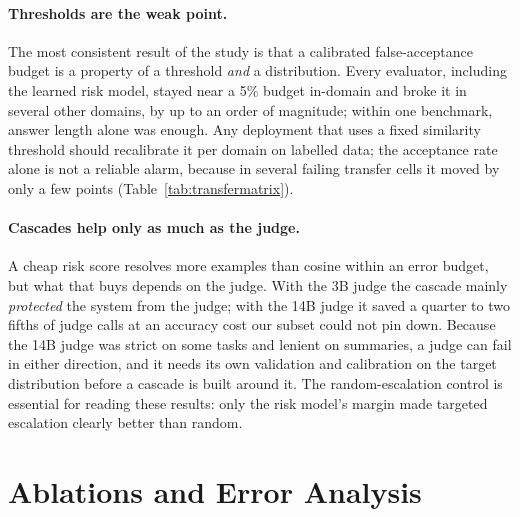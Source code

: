 \paragraph{Thresholds are the weak point.} The most consistent result of the study is that a calibrated false-acceptance budget is a property of a threshold \emph{and} a distribution. Every evaluator, including the learned risk model, stayed near a 5\% budget in-domain and broke it in several other domains, by up to an order of magnitude; within one benchmark, answer length alone was enough. Any deployment that uses a fixed similarity threshold should recalibrate it per domain on labelled data; the acceptance rate alone is not a reliable alarm, because in several failing transfer cells it moved by only a few points (Table~\ref{tab:transfermatrix}).

\paragraph{Cascades help only as much as the judge.} A cheap risk score resolves more examples than cosine within an error budget, but what that buys depends on the judge. With the 3B judge the cascade mainly \emph{protected} the system from the judge; with the 14B judge it saved a quarter to two fifths of judge calls at an accuracy cost our subset could not pin down. Because the 14B judge was strict on some tasks and lenient on summaries, a judge can fail in either direction, and it needs its own validation and calibration on the target distribution before a cascade is built around it. The random-escalation control is essential for reading these results: only the risk model's margin made targeted escalation clearly better than random.

\section{Ablations and Error Analysis}
\label{sec:ablation}

\begin{table}[t]
\centering\small
\setlength{\tabcolsep}{2.5pt}
\resizebox{\columnwidth}{!}{}
\caption{Feature-group ablation of the full risk model (logistic regression, RAGTruth training split). $\Delta$: AUC change on the RAGTruth test split when the group is removed, with a 95\% cluster-bootstrap interval. ``Counterfactual'': share of flips that lower the support score, and AUC for separating originals from flips.}
\label{tab:ablation}
\end{table}

